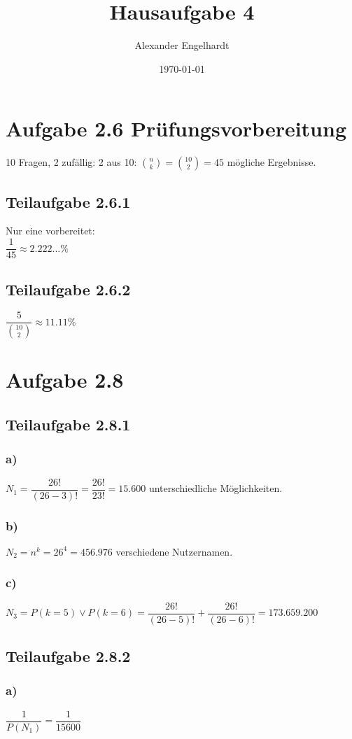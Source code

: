 \documentclass[12pt,a4paper]{article}
\title{Hausaufgabe 4}
\author{Alexander Engelhardt}
\date{\today}
\begin{document}
	\maketitle
	\section*{Aufgabe 2.6 Prüfungsvorbereitung}
	10 Fragen, 2 zufällig:
	2 aus 10: $\binom{n}{k} = \binom{10}{2} = 45$ mögliche Ergebnisse.
	\subsection*{Teilaufgabe 2.6.1}
	Nur eine vorbereitet:\\
	$\dfrac{1}{45} \approx 2.222...\%$
	\subsection*{Teilaufgabe 2.6.2}
	$\dfrac{5}{\binom{10}{2}} \approx 11.11\%$
	
	\section*{Aufgabe 2.8}
	\subsection*{Teilaufgabe 2.8.1}
	\subsubsection*{a)} $N_1 = \dfrac{26!}{(26-3)!} = \dfrac{26!}{23!} = 15.600$ unterschiedliche Möglichkeiten.
	\subsubsection*{b)} $N_2 = n^k = 26^4 = 456.976$ verschiedene Nutzernamen.
	\subsubsection*{c)} $N_3 = P(k=5) \lor P(k=6) = \dfrac{26!}{(26-5)!} + \dfrac{26!}{(26-6)!} = 173.659.200$

	\subsection*{Teilaufgabe 2.8.2}
	\subsubsection*{a)} $\dfrac{1}{P(N_1)} = \dfrac{1}{15600}$
\end{document}
